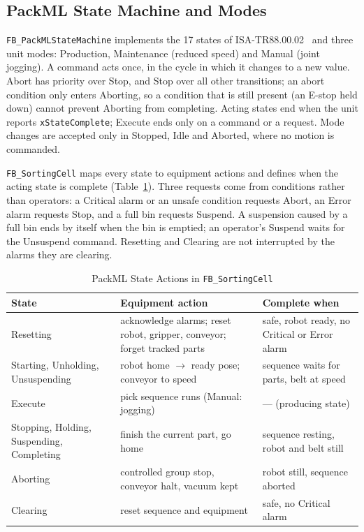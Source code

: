 \subsection{PackML State Machine and Modes}

\texttt{FB\_PackMLStateMachine} implements the 17 states of ISA-TR88.00.02~\cite{ISA-TR88.00.02}
and three unit modes: Production, Maintenance (reduced speed) and Manual (joint jogging). A
command acts once, in the cycle in which it changes to a new value. Abort has priority over
Stop, and Stop over all other transitions; an abort condition only enters Aborting, so a
condition that is still present (an E-stop held down) cannot prevent Aborting from completing.
Acting states end when the unit reports \texttt{xStateComplete}; Execute ends only on a command
or a request. Mode changes are accepted only in Stopped, Idle and Aborted, where no motion is
commanded.

\texttt{FB\_SortingCell} maps every state to equipment actions and defines when the acting state
is complete (Table~\ref{tab:packml}). Three requests come from conditions rather than operators:
a Critical alarm or an unsafe condition requests Abort, an Error alarm requests Stop, and a full
bin requests Suspend. A suspension caused by a full bin ends by itself when the bin is emptied; an
operator's Suspend waits for the Unsuspend command. Resetting and Clearing are not interrupted by
the alarms they are clearing.

\begin{table}[t]
\caption{PackML State Actions in \texttt{FB\_SortingCell}}
\label{tab:packml}
\centering
\footnotesize
\begin{tabular}{@{}p{1.8cm}p{3.1cm}p{2.6cm}@{}}
\toprule
State & Equipment action & Complete when \\
\midrule
Resetting & acknowledge alarms; reset robot, gripper, conveyor; forget tracked parts & safe, robot ready, no Critical or Error alarm \\
Starting, Unholding, Unsuspending & robot home $\rightarrow$ ready pose; conveyor to speed & sequence waits for parts, belt at speed \\
Execute & pick sequence runs (Manual: jogging) & --- (producing state) \\
Stopping, Holding, Suspending, Completing & finish the current part, go home & sequence resting, robot and belt still \\
Aborting & controlled group stop, conveyor halt, vacuum kept & robot still, sequence aborted \\
Clearing & reset sequence and equipment & safe, no Critical alarm \\
\bottomrule
\end{tabular}
\end{table}

